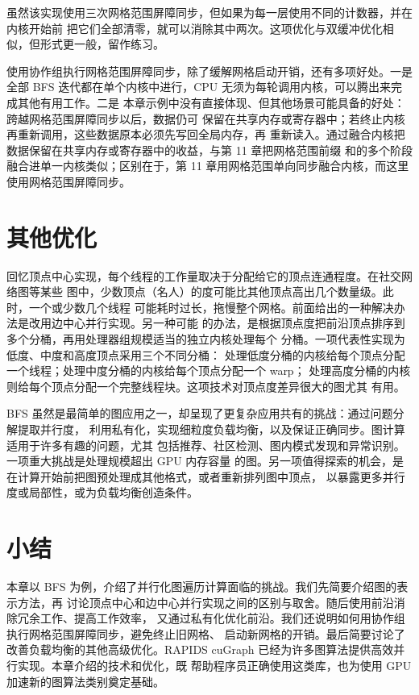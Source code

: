虽然该实现使用三次网格范围屏障同步，但如果为每一层使用不同的计数器，并在内核开始前
把它们全部清零，就可以消除其中两次。这项优化与双缓冲优化相似，但形式更一般，留作练习。

使用协作组执行网格范围屏障同步，除了缓解网格启动开销，还有多项好处。一是全部 BFS
迭代都在单个内核中进行，CPU 无须为每轮调用内核，可以腾出来完成其他有用工作。二是
本章示例中没有直接体现、但其他场景可能具备的好处：跨越网格范围屏障同步以后，数据仍可
保留在共享内存或寄存器中；若终止内核再重新调用，这些数据原本必须先写回全局内存，再
重新读入。通过融合内核把数据保留在共享内存或寄存器中的收益，与第 11 章把网格范围前缀
和的多个阶段融合进单一内核类似；区别在于，第 11 章用网格范围单向同步融合内核，而这里
使用网格范围屏障同步。

\section{其他优化}
\label{sec:bfs-other-optimizations}

回忆顶点中心实现，每个线程的工作量取决于分配给它的顶点连通程度。在社交网络图等某些
图中，少数顶点（名人）的度可能比其他顶点高出几个数量级。此时，一个或少数几个线程
可能耗时过长，拖慢整个网格。前面给出的一种解决办法是改用边中心并行实现。另一种可能
的办法，是根据顶点度把前沿顶点排序到多个分桶，再用处理器组规模适当的独立内核处理每个
分桶。一项代表性实现\cite{merrill2012graph}为低度、中度和高度顶点采用三个不同分桶：
处理低度分桶的内核给每个顶点分配一个线程；处理中度分桶的内核给每个顶点分配一个 warp；
处理高度分桶的内核则给每个顶点分配一个完整线程块。这项技术对顶点度差异很大的图尤其
有用。

BFS 虽然是最简单的图应用之一，却呈现了更复杂应用共有的挑战：通过问题分解提取并行度，
利用私有化，实现细粒度负载均衡，以及保证正确同步。图计算适用于许多有趣的问题，尤其
包括推荐、社区检测、图内模式发现和异常识别。一项重大挑战是处理规模超出 GPU 内存容量
的图。另一项值得探索的机会，是在计算开始前把图预处理成其他格式，或者重新排列图中顶点，
以暴露更多并行度或局部性，或为负载均衡创造条件。

\section{小结}
\label{sec:bfs-summary}

本章以 BFS 为例，介绍了并行化图遍历计算面临的挑战。我们先简要介绍图的表示方法，再
讨论顶点中心和边中心并行实现之间的区别与取舍。随后使用前沿消除冗余工作、提高工作效率，
又通过私有化优化前沿。我们还说明如何用协作组执行网格范围屏障同步，避免终止旧网格、
启动新网格的开销。最后简要讨论了改善负载均衡的其他高级优化。RAPIDS cuGraph
\cite{fender2022cugraph} 已经为许多图算法提供高效并行实现。本章介绍的技术和优化，既
帮助程序员正确使用这类库，也为使用 GPU 加速新的图算法类别奠定基础。

